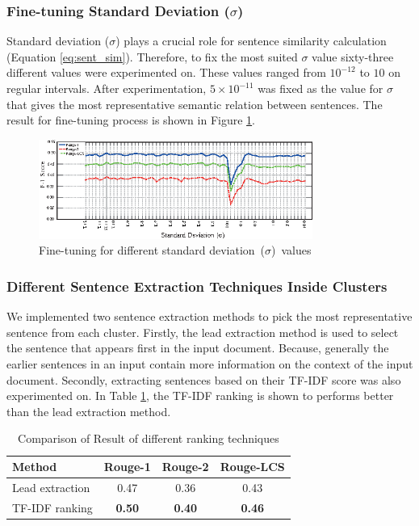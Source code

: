 \documentclass[acmlarge]{acmart}
\begin{document}
\subsubsection{Fine-tuning Standard Deviation ($\sigma$)}\label{subsubsec:sigma}
Standard deviation ($\sigma$) plays a crucial role for sentence similarity calculation (Equation \ref{eq:sent_sim}). Therefore, to fix the most suited $\sigma$ value sixty-three different values were experimented on. These values ranged from $10^{-12}$ to $10$ on regular intervals. After experimentation, $5\times10^{-11}$ was fixed as the value for $\sigma$ that gives the most representative semantic relation between sentences. The result for fine-tuning process is shown in Figure \ref{fig:sigma-fine-tuning}.
\begin{figure}[]
	\centering
	\includegraphics[width=0.8\textwidth]{figs/fine-tuning-edited}
	\caption{Fine-tuning for different standard deviation~($\sigma$)~values}
	\label{fig:sigma-fine-tuning}
\end{figure}

\subsubsection{Different Sentence Extraction Techniques Inside Clusters} \label{subsubsec:different-ranking-techniques-inside-clusters}
We implemented two sentence extraction methods to pick the most representative sentence from each cluster. Firstly, the lead extraction method is used to select the sentence that appears first in the input document. Because, generally the earlier sentences in an input contain more information on the context of the input document. Secondly, extracting sentences based on their TF-IDF score was also experimented on. In Table \ref{tab:ranking}, the TF-IDF ranking is shown to performs better than the lead extraction method.
\begin{table}[]
	\centering
	\begin{tabular}{lccc}\hline
		Method      	& Rouge-1       & Rouge-2       & Rouge-LCS     \\\hline
		Lead extraction	& 0.47          & 0.36          & 0.43          \\
		TF-IDF ranking	& \textbf{0.50} & \textbf{0.40} & \textbf{0.46} \\\hline
	\end{tabular}
	\caption{Comparison of Result of different ranking techniques}
	\label{tab:ranking}
\end{table}
\end{document}
